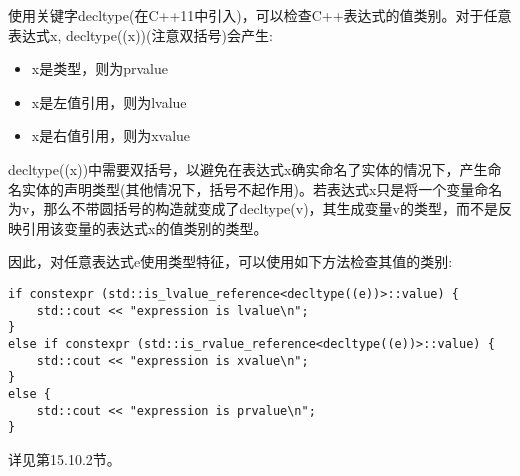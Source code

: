 使用关键字decltype(在C++11中引入)，可以检查C++表达式的值类别。对于任意表达式x, decltype((x))(注意双括号)会产生:

\begin{itemize}
\item 
x是类型，则为prvalue

\item
x是左值引用，则为lvalue

\item
x是右值引用，则为xvalue
\end{itemize}

decltype((x))中需要双括号，以避免在表达式x确实命名了实体的情况下，产生命名实体的声明类型(其他情况下，括号不起作用)。若表达式x只是将一个变量命名为v，那么不带圆括号的构造就变成了decltype(v)，其生成变量v的类型，而不是反映引用该变量的表达式x的值类别的类型。

因此，对任意表达式e使用类型特征，可以使用如下方法检查其值的类别:

\begin{lstlisting}[style=styleCXX]
if constexpr (std::is_lvalue_reference<decltype((e))>::value) {
	std::cout << "expression is lvalue\n";
}
else if constexpr (std::is_rvalue_reference<decltype((e))>::value) {
	std::cout << "expression is xvalue\n";
}
else {
	std::cout << "expression is prvalue\n";
}
\end{lstlisting}

详见第15.10.2节。







